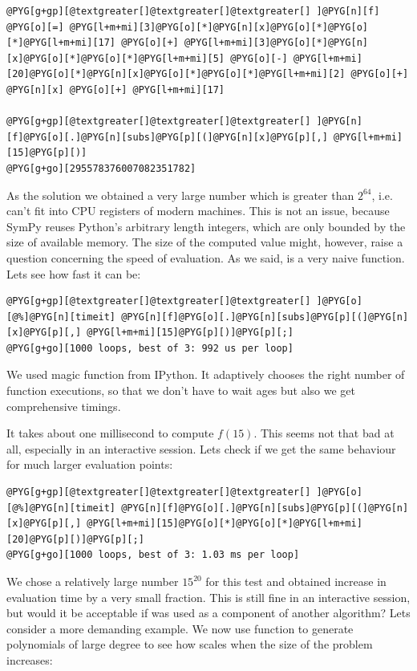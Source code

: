 \begin{Verbatim}[commandchars=@\[\]]
@PYG[g+gp][@textgreater[]@textgreater[]@textgreater[] ]@PYG[n][f] @PYG[o][=] @PYG[l+m+mi][3]@PYG[o][*]@PYG[n][x]@PYG[o][*]@PYG[o][*]@PYG[l+m+mi][17] @PYG[o][+] @PYG[l+m+mi][3]@PYG[o][*]@PYG[n][x]@PYG[o][*]@PYG[o][*]@PYG[l+m+mi][5] @PYG[o][-] @PYG[l+m+mi][20]@PYG[o][*]@PYG[n][x]@PYG[o][*]@PYG[o][*]@PYG[l+m+mi][2] @PYG[o][+] @PYG[n][x] @PYG[o][+] @PYG[l+m+mi][17]

@PYG[g+gp][@textgreater[]@textgreater[]@textgreater[] ]@PYG[n][f]@PYG[o][.]@PYG[n][subs]@PYG[p][(]@PYG[n][x]@PYG[p][,] @PYG[l+m+mi][15]@PYG[p][)]
@PYG[g+go][295578376007082351782]
\end{Verbatim}
\noindent
As the solution we obtained a very large number which is greater than $2^64$, i.e. can't fit
into CPU registers of modern machines. This is not an issue, because SymPy reuses Python's
arbitrary length integers, which are only bounded by the size of available memory. The size
of the computed value might, however, raise a question concerning the speed of evaluation. As
we said,  is a very naive function. Lets see how fast it can be:

\begin{Verbatim}[commandchars=@\[\]]
@PYG[g+gp][@textgreater[]@textgreater[]@textgreater[] ]@PYG[o][@%]@PYG[n][timeit] @PYG[n][f]@PYG[o][.]@PYG[n][subs]@PYG[p][(]@PYG[n][x]@PYG[p][,] @PYG[l+m+mi][15]@PYG[p][)]@PYG[p][;]
@PYG[g+go][1000 loops, best of 3: 992 us per loop]
\end{Verbatim}
\noindent
We used  magic function from IPython. It adaptively chooses the right number of
function executions, so that we don't have to wait ages but also we get comprehensive timings.

It takes  about one millisecond to compute $f(15)$. This seems not that bad at all,
especially in an interactive session. Lets check if we get the same behaviour for much larger
evaluation points:

\begin{Verbatim}[commandchars=@\[\]]
@PYG[g+gp][@textgreater[]@textgreater[]@textgreater[] ]@PYG[o][@%]@PYG[n][timeit] @PYG[n][f]@PYG[o][.]@PYG[n][subs]@PYG[p][(]@PYG[n][x]@PYG[p][,] @PYG[l+m+mi][15]@PYG[o][*]@PYG[o][*]@PYG[l+m+mi][20]@PYG[p][)]@PYG[p][;]
@PYG[g+go][1000 loops, best of 3: 1.03 ms per loop]
\end{Verbatim}
\noindent
We chose a relatively large number $15^20$ for this test and obtained increase in evaluation
time by a very small fraction. This is still fine in an interactive session, but would it be
acceptable if  was used as a component of another algorithm? Lets consider a more
demanding example. We now use  function to generate polynomials of large
degree to see how  scales when the size of the problem increases:

